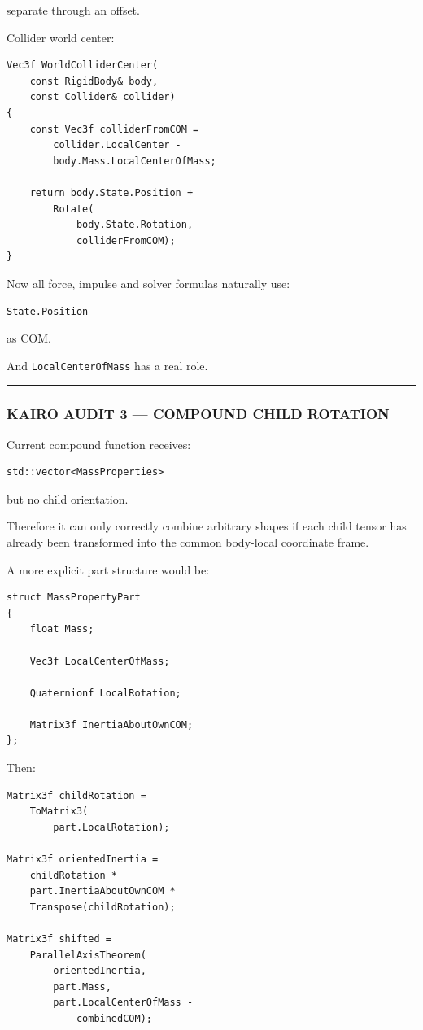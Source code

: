 separate through an offset.

Collider world center:

\begin{verbatim}
Vec3f WorldColliderCenter(
    const RigidBody& body,
    const Collider& collider)
{
    const Vec3f colliderFromCOM =
        collider.LocalCenter -
        body.Mass.LocalCenterOfMass;

    return body.State.Position +
        Rotate(
            body.State.Rotation,
            colliderFromCOM);
}
\end{verbatim}

Now all force, impulse and solver formulas naturally use:

\begin{verbatim}
State.Position
\end{verbatim}

as COM.

And \texttt{LocalCenterOfMass} has a real role.

\begin{center}\rule{0.5\linewidth}{0.5pt}\end{center}

\subsubsection{KAIRO AUDIT 3 --- COMPOUND CHILD ROTATION}\label{kairo-audit-3-compound-child-rotation}

Current compound function receives:

\begin{verbatim}
std::vector<MassProperties>
\end{verbatim}

but no child orientation.

Therefore it can only correctly combine arbitrary shapes if each child tensor has already been transformed into the common body-local coordinate frame.

A more explicit part structure would be:

\begin{verbatim}
struct MassPropertyPart
{
    float Mass;

    Vec3f LocalCenterOfMass;

    Quaternionf LocalRotation;

    Matrix3f InertiaAboutOwnCOM;
};
\end{verbatim}

Then:

\begin{verbatim}
Matrix3f childRotation =
    ToMatrix3(
        part.LocalRotation);

Matrix3f orientedInertia =
    childRotation *
    part.InertiaAboutOwnCOM *
    Transpose(childRotation);

Matrix3f shifted =
    ParallelAxisTheorem(
        orientedInertia,
        part.Mass,
        part.LocalCenterOfMass -
            combinedCOM);
\end{verbatim}

